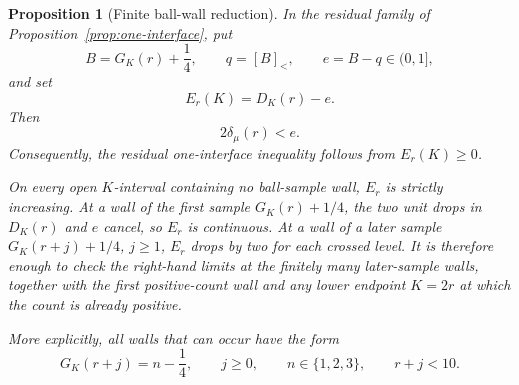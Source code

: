 \documentclass[11pt]{article}
\newtheorem{proposition}[theorem]{Proposition}
\theoremstyle{remark}
\begin{document}
\begin{proposition}[Finite ball-wall reduction]
\label{prop:finite-wall}
In the residual family of Proposition~\ref{prop:one-interface}, put
\[
 B=G_K(r)+\frac14,\qquad
 q=[B]_<,\qquad
 e=B-q\in(0,1],
\]
and set
\[
 E_r(K)=D_K(r)-e.
\]
Then
\begin{equation}
 2\delta_\mu(r)<e.
 \label{eq:delta-below-remainder}
\end{equation}
Consequently, the residual one-interface inequality follows from
$E_r(K)\geq0$.

On every open $K$-interval containing no ball-sample wall,
$E_r$ is strictly increasing.  At a wall of the first sample
$G_K(r)+1/4$, the two unit drops in $D_K(r)$ and $e$ cancel, so $E_r$ is
continuous.  At a wall of a later sample $G_K(r+j)+1/4$, $j\geq1$,
$E_r$ drops by two for each crossed level.  It is therefore enough to
check the right-hand limits at the finitely many later-sample walls,
together with the first positive-count wall and any lower endpoint
$K=2r$ at which the count is already positive.

More explicitly, all walls that can occur have the form
\begin{equation}
 G_K(r+j)=n-\frac14,
 \qquad
 j\geq0,\qquad n\in\{1,2,3\},\qquad r+j<10.
 \label{eq:finite-wall-list}
\end{equation}
\end{proposition}
\end{document}
